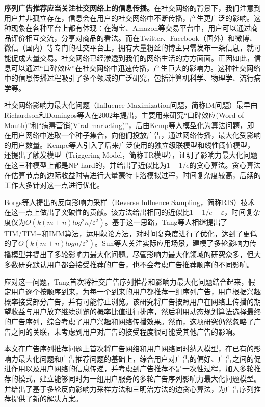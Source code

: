 \textbf{序列广告推荐应当关注社交网络上的信息传播。}在社交网络的背景下，我们注意到用户并非孤立存在，信息会在用户的社交网络中不断传播，产生更广泛的影响。这种现象在各种平台上都有体现：在淘宝、Amazon等交易平台中，用户可以通过商品评价相互交流，分享对商品的看法。而在Twitter、Facebook（国外）和微博、微信（国内）等专门的社交平台上，拥有大量粉丝的博主只需发布一条信息，就可能促成大量交易。社交网络已经渗透到我们的网络生活的方方面面。正因如此，信息可以通过“口碑效应”在社交网络中迅速传播，产生巨大的影响力。这种社交网络中的信息传播过程吸引了多个领域的广泛研究，包括计算机科学、物理学、流行病学等\cite{li2018influence}。

社交网络影响力最大化问题（Influence Maximization问题，简称IM问题）最早由Richardson和Domingos等人\cite{richardson2002mining}在2002年提出，主要用来研究“口碑效应(Word-of-Mouth)”和“病毒营销(Viral marketing)”，后由Kemp等人\cite{kempe2003maximizing}模型化为算法问题，即在用户网络中选取一个种子集合，向他们投放广告，通过网络传播，最大化受影响的用户数量。Kempe等人引入了后来广泛使用的独立级联模型\cite{goldenberg2001talk}和线性阈值模型\cite{granovetter1978threshold}，还提出了触发模型（Triggering Model，简称TR模型），证明了影响力最大化问题在这三种模型上都是NP-hard的，并给出了近似比为$1-1/e$的贪心算法。贪心算法在估算节点的边际收益时需进行大量蒙特卡洛模拟过程，时间复杂度较高，后续的工作大多针对这一点进行优化。

Borgs等人\cite{borgs2014maximizing}提出的反向影响力采样（Reverse Influence Sampling，简称RIS）技术在这一点上做出了突破性的贡献。该方法给出相同的近似比$1-1/e-\varepsilon$，时间复杂度仅为$O(k(m+n)log^2n/\varepsilon^2)$。基于这一思路，Tang等人相继提出了TIM/TIM+\cite{tang2014influence}和IMM\cite{tang2015influence}算法，运用鞅论方法，对时间复杂度进行了优化，达到了更低的了$O(k(m+n)logn/\varepsilon^2)$。Sun等人关注实际应用场景，建模了多轮影响力传播模型并提出了多轮影响力最大化问题\cite{mrim}。尽管影响力最大化领域的研究众多，但大多数研究默认用户都会接受推荐的广告，也不会考虑广告推荐顺序的不同影响。

应对这一问题，Tang\cite{tang2018social}首次将社交广告序列推荐和影响力最大化问题结合起来，假定用户逐个按顺序到来，为每一个到来的用户都推荐一组序列广告，用户根据兴趣概率接受部分广告，并有可能停止浏览。该研究将广告按照用户在网络上传播的期望收益与用户放弃继续浏览的概率比值进行排序，然后利用动态规划算法选择最终的广告序列，综合考虑了用户兴趣和网络传播效果。然而，这项研究仍然忽略了广告之间的关联，未考虑到用户对广告的接受程度很可能受其他广告的影响。

本文在广告序列推荐问题上首次将广告网络和用户网络同时纳入模型，在已有的影响力最大化问题和广告推荐问题的基础上，综合用户对广告的偏好、广告之间的促进作用以及用户网络的信息传递，并考虑到广告推荐不是一次性过程，加入多轮推荐的模式，建立能够同时为一组用户服务的多轮广告序列影响力最大化问题模型。并给出了基于多轮反向影响力采样方法和三明治方法的边贪心算法，为广告序列推荐提供了新的解决方案。


